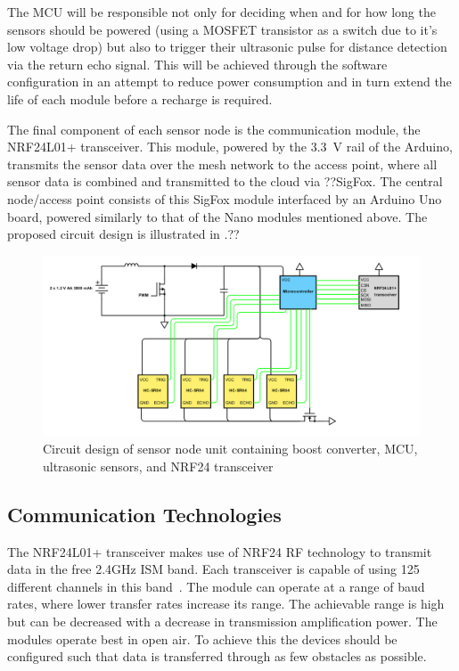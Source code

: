 \documentclass[10pt,twocolumn]{witseiepaper}
\begin{document}
		The MCU will be responsible not only for deciding when and for how long the sensors should be powered (using a MOSFET transistor as a switch due to it's low voltage drop) but also to trigger their ultrasonic pulse for distance detection via the return echo signal. This will be achieved through the software configuration in an attempt to reduce power consumption and in turn extend the life of each module before a recharge is required.
		
		The final component of each sensor node is the communication module, the NRF24L01+ transceiver. This module, powered by the 3.3~V rail of the Arduino, transmits the sensor data over the mesh network to the access point, where all sensor data is combined and transmitted to the cloud via ??SigFox. The central node/access point consists of this SigFox module interfaced by an Arduino Uno board, powered similarly to that of the Nano modules mentioned above. The proposed circuit design is illustrated in .??

		\begin{figure}[h]
			\centering
			\includegraphics[width=\textwidth]{media/node-circuit.png}
			\caption{Circuit design of sensor node unit containing boost converter, MCU, ultrasonic sensors, and NRF24 transceiver}
			\raggedright
			\label{fig:node-circuit}
		\end{figure}
	
	\subsection{Communication Technologies}
		The NRF24L01+ transceiver makes use of NRF24 RF technology to transmit data in the free 2.4GHz ISM band. Each transceiver is capable of using 125 different channels in this band~\cite{howToMech_NRF24L01Tutorial}. The module can operate at a range of baud rates, where lower transfer rates increase its range. The achievable range is high but can be decreased with a decrease in transmission amplification power. The modules operate best in open air. To achieve this the devices should be configured such that data is transferred through as few obstacles as possible. 
	
\end{document}

